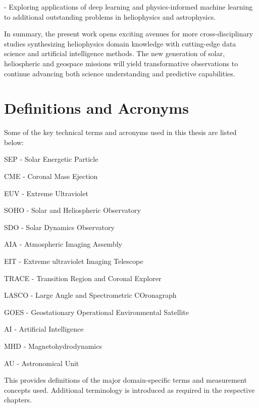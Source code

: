 - Exploring applications of deep learning and physics-informed machine learning to additional outstanding problems in heliophysics and astrophysics.

In summary, the present work opens exciting avenues for more cross-disciplinary studies synthesizing heliophysics domain knowledge with cutting-edge data science and artificial intelligence methods. The new generation of solar, heliospheric and geospace missions will yield transformative observations to continue advancing both science understanding and predictive capabilities.

\section{Definitions and Acronyms}
Some of the key technical terms and acronyms used in this thesis are listed below:

SEP - Solar Energetic Particle

CME - Coronal Mass Ejection 

EUV - Extreme Ultraviolet

SOHO - Solar and Heliospheric Observatory

SDO - Solar Dynamics Observatory

AIA - Atmospheric Imaging Assembly 

EIT - Extreme ultraviolet Imaging Telescope

TRACE - Transition Region and Coronal Explorer

LASCO - Large Angle and Spectrometric COronagraph

GOES - Geostationary Operational Environmental Satellite

AI - Artificial Intelligence

MHD - Magnetohydrodynamics

AU - Astronomical Unit

This provides definitions of the major domain-specific terms and measurement concepts used. Additional terminology is introduced as required in the respective chapters.
